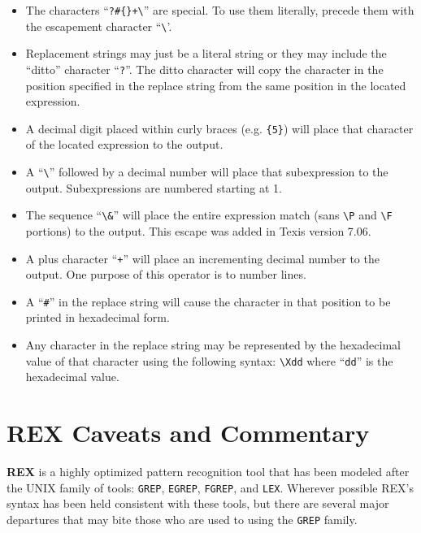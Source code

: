\begin{itemize}

\item The characters ``\verb`?#{}+\`'' are special.  To use them
      literally, precede them with the escapement character
      ``\verb`\`'.

\item  Replacement strings may just be a literal string or they may
       include the ``ditto'' character ``\verb`?`''.  The ditto character
       will copy the character in the position specified in the
       replace string from the same position in the located expression.

\item  A decimal digit placed within curly braces (e.g. \verb`{5}`) will place
       that character of the located expression to the output.

\item A ``\verb`\`'' followed by a decimal number will place that
      subexpression to the output. Subexpressions are numbered starting at
      1.

\item The sequence ``\verb`\&`'' will place the entire expression match
      (sans \verb`\P` and \verb`\F` portions) to the output.  This escape
      was added in Texis version 7.06.

\item  A plus character ``\verb`+`'' will place an incrementing decimal
       number to the output. One purpose of this operator is to number lines.

\item  A ``\verb`#`'' in the replace string will cause the character in that
       position to be printed in hexadecimal form.

\item  Any character in the replace string may be represented by the
       hexadecimal value of that character using the following syntax:
       \verb`\Xdd` where ``\verb`dd`'' is the hexadecimal value.
\end{itemize}


\section{REX Caveats and Commentary}

{\bf REX} is a highly optimized pattern recognition tool that has been
modeled after the UNIX family of tools:  \verb`GREP`, \verb`EGREP`,
\verb`FGREP`, and \verb`LEX`.  Wherever possible REX's syntax
has been held consistent with these tools, but there are several major
departures that may bite those who are used to using the \verb`GREP`
family.

